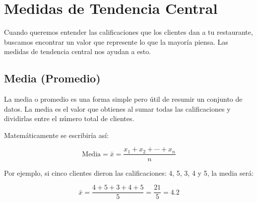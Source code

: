 \documentclass[
  spanish,
  letterpaper,
  DIV=11,
  numbers=noendperiod]{scrreprt}
\begin{document}
\section{Medidas de Tendencia
Central}\label{medidas-de-tendencia-central}

Cuando queremos entender las calificaciones que los clientes dan a tu
restaurante, buscamos encontrar un valor que represente lo que la
mayoría piensa. Las medidas de tendencia central nos ayudan a esto.

\subsection{Media (Promedio)}\label{media-promedio}

La media o promedio es una forma simple pero útil de resumir un conjunto
de datos. La media es el valor que obtienes al sumar todas las
calificaciones y dividirlas entre el número total de clientes.

\begin{tcolorbox}[enhanced jigsaw, arc=.35mm, leftrule=.75mm, opacityback=0, left=2mm, breakable, colframe=quarto-callout-tip-color-frame, toprule=.15mm, colback=white, bottomrule=.15mm, rightrule=.15mm]
\begin{minipage}[t]{5.5mm}
\textcolor{quarto-callout-tip-color}{\faLightbulb}
\end{minipage}%
\begin{minipage}[t]{\textwidth - 5.5mm}

Matemáticamente se escribiría así:

\[
\text{Media} = \bar{x} = \frac{x_1 + x_2 + \cdots + x_n}{n}
\]

\end{minipage}%
\end{tcolorbox}

Por ejemplo, si cinco clientes dieron las calificaciones: 4, 5, 3, 4 y
5, la media será:

\begin{tcolorbox}[enhanced jigsaw, arc=.35mm, leftrule=.75mm, opacityback=0, left=2mm, breakable, colframe=quarto-callout-tip-color-frame, toprule=.15mm, colback=white, bottomrule=.15mm, rightrule=.15mm]
\begin{minipage}[t]{5.5mm}
\textcolor{quarto-callout-tip-color}{\faLightbulb}
\end{minipage}%
\begin{minipage}[t]{\textwidth - 5.5mm}

\[
\bar{x} = \frac{4 + 5 + 3 + 4 + 5}{5} = \frac{21}{5} = 4.2
\]

\end{minipage}%
\end{tcolorbox}
\end{document}
